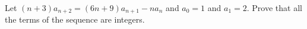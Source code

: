 Let \((n+3)a_{n+2}=(6n+9)a_{n+1}-na_n\) and \(a_0=1\) and \(a_1=2\). Prove that all the terms of the sequence are integers.
